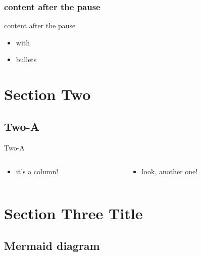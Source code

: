 \documentclass[
  ignorenonframetext,
  aspectratio=169,
]{beamer}
\providecommand{\tightlist}{%
  \setlength{\itemsep}{0pt}\setlength{\parskip}{0pt}}
\begin{document}
\hypertarget{content-after-the-pause}{%
\subsubsection{content after the pause}\label{content-after-the-pause}}

\begin{frame}{content after the pause}
\begin{itemize}[<+->]
\tightlist
\item
  with
\item
  bullets
\end{itemize}
\end{frame}

\hypertarget{section-two}{%
\section{Section Two}\label{section-two}}

\hypertarget{two-a}{%
\subsection{Two-A}\label{two-a}}

\begin{frame}{Two-A}
\begin{columns}[T]
\begin{column}{0.48\textwidth}
\begin{itemize}[<+->]
\tightlist
\item
  it's a column!
\end{itemize}
\end{column}

\begin{column}{0.48\textwidth}
\begin{itemize}[<+->]
\tightlist
\item
  look, another one!
\end{itemize}
\end{column}
\end{columns}
\end{frame}

\hypertarget{section-three-title}{%
\section{Section Three Title}\label{section-three-title}}

\hypertarget{mermaid-diagram}{%
\subsection{Mermaid diagram}\label{mermaid-diagram}}
\end{document}

